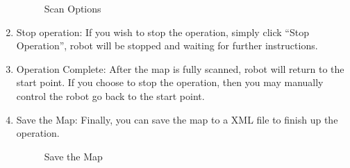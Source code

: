 \documentclass[11pt, a4paper]{report}
\begin{document}
\begin{enumerate}
\begin{figure}[ht]
														\centering
														\setlength\fboxsep{2pt}
														\setlength\fboxrule{0.2pt}
														\caption{Scan Options}
														\label{sec:so}
														\label{fig:so}
														\end{figure}

	\item {Stop operation: }If you wish to stop the operation, simply click ``Stop Operation'', robot will be stopped and waiting for further instructions.
	\item {Operation Complete: }After the map is fully scanned, robot will return to the start point. If you choose to stop the operation, then you may manually control the robot go back to the start point.\pagebreak
	\item {Save the Map: }Finally, you can save the map to a XML file to finish up the operation.
														\begin{figure}[ht]
														\centering
														\setlength\fboxsep{2pt}
														\setlength\fboxrule{0.2pt}
														\caption{Save the Map}
														\label{sec:sm}
														\label{fig:sm}
														\end{figure}

\end{enumerate}




\end{document}
